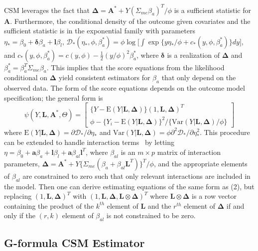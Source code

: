 \documentclass[useAMS,usenatbib,referee]{biom}
\begin{document}
CSM leverages the fact that $\bm{\Delta} = \bm{A}^{*} + Y(\Sigma_{me}\beta_{a})^{T}/\phi$ is a sufficient statistic for $\bm{A}$. Furthermore, the conditional density of the outcome given covariates and the sufficient statistic is in the exponential family with parameters $\eta_{*} = \beta_{0} + \bm{\delta}\beta_{a} + \bm{l}\beta_{l}$, $\mathcal{D}_{*}(\eta_{*}, \phi, \beta_{a}^{*}) = \phi \log \bigg[ \int \exp \{ y\eta_{*}/\phi + c_{*}(y, \phi, \beta_{a}^{*}) \} dy \bigg]$, and $c_{*}(y, \phi, \beta_{a}^{*}) = c(y, \phi) - \frac{1}{2}(y/\phi)^{2}\beta_{a}^{*}$, where $\bm{\delta}$ is a realization of $\bm{\Delta}$ and $\beta_{a}^{*} = \beta_{a}^{T}\Sigma_{me}\beta_{a}$. This implies that the score equations from the likelihood conditional on $\bm{\Delta}$ yield consistent estimators for $\beta_{a}$ that only depend on the observed data. The form of the score equations depends on the outcome model specification; the general form is
\begin{equation}
    \psi(Y, \bm{L}, \bm{A}^{*}, \Theta) =
    \begin{bmatrix}
       \{ Y - \text{E}(Y | \bm{L}, \bm{\Delta}) \} (1, \bm{L}, \bm{\Delta})^{T} \\
        \phi - \{ Y_{i} - \text{E}(Y | \bm{L}, \bm{\Delta}) \}^{2} / \{ \text{Var}(Y | \bm{L}, \bm{\Delta}) / \phi \}
    \end{bmatrix}
\end{equation}
where $\text{E}(Y | \bm{L}, \bm{\Delta}) = \partial \mathcal{D}_{*} / \partial \eta_{*}$ and $\text{Var}(Y | \bm{L}, \bm{\Delta}) = \phi \partial^{2} \mathcal{D}_{*} / \partial \eta^{2}_{*}$. This procedure can be extended to handle interaction terms~\citep{dagalp2001} by letting $\eta = \beta_{0} + \bm{a}\beta_{a} + \bm{l}\beta_{l} + \bm{a}\beta_{al}\bm{l}^{T}$, where $\beta_{al}$ is an $m \times p$ matrix of interaction parameters, $\bm{\Delta} = \bm{A}^{*} + Y\{ \Sigma_{me}(\beta_{a} + \beta_{al}\bm{L}^{T}) \}^{T}/\phi$, and the appropriate elements of $\beta_{al}$ are constrained to zero such that only relevant interactions are included in the model. Then one can derive estimating equations of the same form as (2), but replacing $(1, \bm{L}, \bm{\Delta})^{T}$ with $(1, \bm{L}, \bm{\Delta}, \bm{L} \otimes \bm{\Delta})^{T}$ where $\bm{L} \otimes \bm{\Delta}$ is a row vector containing the product of the $k^{th}$ element of $\bm{L}$ and the $r^{th}$ element of $\bm{\Delta}$ if and only if the $(r, k)$ element of $\beta_{al}$ is not constrained to be zero.

\subsection{G-formula CSM Estimator}
\end{document}
